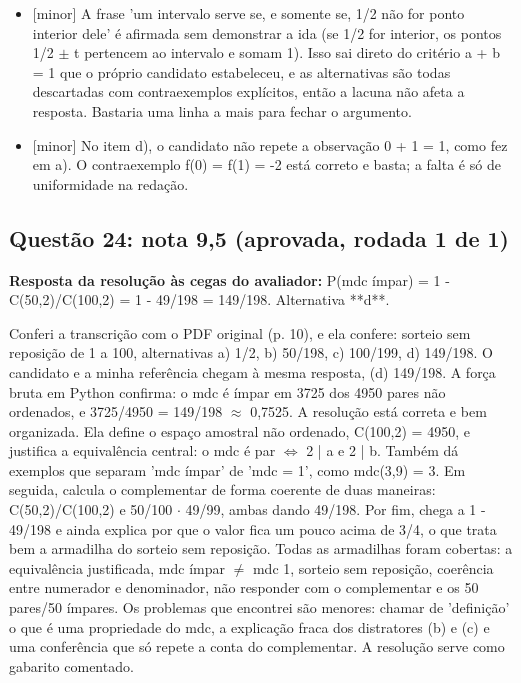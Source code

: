\documentclass{article}%
\begin{document}
\begin{itemize}%
\item%
{[}minor{]} A frase 'um intervalo serve se, e somente se, 1/2 não for ponto interior dele' é afirmada sem demonstrar a ida (se 1/2 for interior, os pontos 1/2 $\pm$ t pertencem ao intervalo e somam 1). Isso sai direto do critério a + b = 1 que o próprio candidato estabeleceu, e as alternativas são todas descartadas com contraexemplos explícitos, então a lacuna não afeta a resposta. Bastaria uma linha a mais para fechar o argumento.%
\item%
{[}minor{]} No item d), o candidato não repete a observação 0 + 1 = 1, como fez em a). O contraexemplo f(0) = f(1) = -2 está correto e basta; a falta é só de uniformidade na redação.%
\end{itemize}%
\subsection*{Questão 24: nota 9,5 (aprovada, rodada 1 de 1)}%
\textbf{Resposta da resolução às cegas do avaliador:} P(mdc ímpar) = 1 - C(50,2)/C(100,2) = 1 - 49/198 = 149/198. Alternativa **d**.\par %
Conferi a transcrição com o PDF original (p. 10), e ela confere: sorteio sem reposição de 1 a 100, alternativas a) 1/2, b) 50/198, c) 100/199, d) 149/198. O candidato e a minha referência chegam à mesma resposta, (d) 149/198. A força bruta em Python confirma: o mdc é ímpar em 3725 dos 4950 pares não ordenados, e 3725/4950 = 149/198 $\approx$ 0,7525.\newline%
\newline%
A resolução está correta e bem organizada. Ela define o espaço amostral não ordenado, C(100,2) = 4950, e justifica a equivalência central: o mdc é par $\Leftrightarrow$ 2 | a e 2 | b. Também dá exemplos que separam 'mdc ímpar' de 'mdc = 1', como mdc(3,9) = 3. Em seguida, calcula o complementar de forma coerente de duas maneiras: C(50,2)/C(100,2) e 50/100 $\cdot$ 49/99, ambas dando 49/198. Por fim, chega a 1 - 49/198 e ainda explica por que o valor fica um pouco acima de 3/4, o que trata bem a armadilha do sorteio sem reposição.\newline%
\newline%
Todas as armadilhas foram cobertas: a equivalência justificada, mdc ímpar $\neq$ mdc 1, sorteio sem reposição, coerência entre numerador e denominador, não responder com o complementar e os 50 pares/50 ímpares. Os problemas que encontrei são menores: chamar de 'definição' o que é uma propriedade do mdc, a explicação fraca dos distratores (b) e (c) e uma conferência que só repete a conta do complementar. A resolução serve como gabarito comentado.%
\end{document}
